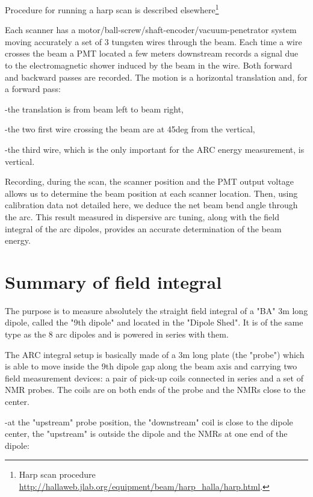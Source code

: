 {Procedure for running a harp scan is described elsewhere\footnote{
Harp scan procedure \url{http://hallaweb.jlab.org/equipment/beam/harp_halla/harp.html}.}

Each scanner has a motor/ball-screw/shaft-encoder/vacuum-penetrator system moving
accurately a set of 3 tungsten wires through the beam. Each time a wire crosses
the beam a PMT located a few meters downstream records a signal due to the 
electromagnetic
shower induced by the beam in the wire. Both forward and backward passes are
recorded. The motion is a horizontal translation and, for a forward pass: 

-the translation is from beam left to beam right, 

-the two first wire crossing the beam are at 45deg from the vertical, 

-the third wire, which is the only important for the ARC energy measurement,
is vertical. 

Recording, during the scan, the scanner position and the PMT output voltage
allows us to determine the beam position at each scanner location. Then, using
calibration data not detailed here, we deduce the net beam bend angle through
the arc. This result measured in dispersive arc tuning, along with the field
integral of the arc dipoles, provides an accurate determination of the beam
energy. 

\vspace{0.3cm}

\section{Summary of field integral }

The purpose is to measure absolutely the straight field integral of a 
"BA"
3m long dipole, called the "9th dipole" and located in the
"Dipole Shed". It is of the same type as the 8 arc dipoles
and is powered in series with them. 

The ARC integral setup is basically made of a 3m long plate (the 
"probe")
which is able to move inside the 9th dipole gap along the beam axis and carrying 
two
field measurement devices: a pair of pick-up coils connected in series and a
set of NMR probes. The coils are on both ends of the probe and the NMRs close
to the center. 

-at the "upstream" probe position, the 
"downstream"
coil is close to the dipole center, the "upstream" is outside
the dipole and the NMRs at one end of the dipole: 

}
